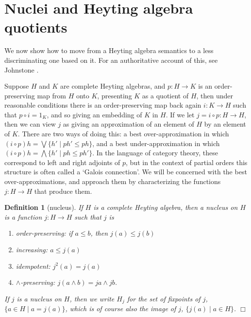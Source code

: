 \documentclass{sn-jnl}
\newcommand{\todo}[1]{\textcolor{red} {[todo: {#1}]}}
\newtheorem{definition}[theorem]{Definition}
\newcommand{\fillBox}{\hfill$\Box$}
\begin{document}
\section{Nuclei and Heyting algebra quotients}\label{sec:Nuclei}

We now show how to move from a Heyting algebra semantics to a less discriminating one based on it. For an authoritative account of this, see Johnstone \cite{johnstone1982stone}.

Suppose $H$ and $K$ are complete Heyting algebras, and $p: H\to K$ is 
an order-preserving map from $H$ onto $K$, presenting $K$ as a quotient of $H$, then under reasonable conditions there is an order-preserving map back again $i: K\to H$ such that $p\circ i = 1_K$, and so giving an embedding of $K$ in $H$. If we let $j = i \circ p : H \to H$, then we can view $j$ as giving an approximation of an element of $H$ by an element of $K$. There are two ways of doing this: a best over-approximation in which 
$(i \circ p) h = \bigvee \{ h' \mid ph' \leq ph\}$, and a best under-approximation in which $(i\circ p) h = \bigwedge \{ h'\mid ph \leq ph'\}$. In the language of category theory, these correspond to left and right adjoints of $p$, but in the context of partial orders this structure is often called a `Galois connection'. We will be concerned with the best over-approximations, and approach them by characterizing the functions $j : H \to H$ that produce them. 

\smallskip 

\begin{definition}[nucleus]\label{def:nucleus} 
If $H$ is a complete Heyting algebra, then a {\em nucleus} on $H$ is a function $j: H\to H$ such that $j$ is \smallskip
\begin{enumerate}
    \item order-preserving: if $a\leq b$, then $j(a) \leq j(b)$
    \item increasing: $a\leq j(a)$
    \item idempotent: $j^2 (a) = j(a)$
    \item $\wedge$-preserving: $j(a\wedge b) = ja \wedge jb$. 
\end{enumerate} \smallskip 
If $j$ is a nucleus on $H$, then we write $H_j$ for the set of 
fixpoints of $j$,  
$\{a \in H \mid a = j(a)\}$, which is of course also the image of $j$, $\{ j(a) \mid a \in H\}$. \fillBox
\end{definition}
\end{document}

